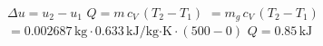 \( \Delta u = u_2 - u_1 \)  
\( Q = m \, c_V \, (T_2 - T_1) \)  
\( = m_g \, c_V \, (T_2 - T_1) \)  
\( = 0.002687 \, \text{kg} \cdot 0.633 \, \text{kJ/kg·K} \cdot (500 - 0) \)  
\( Q = 0.85 \, \text{kJ} \)